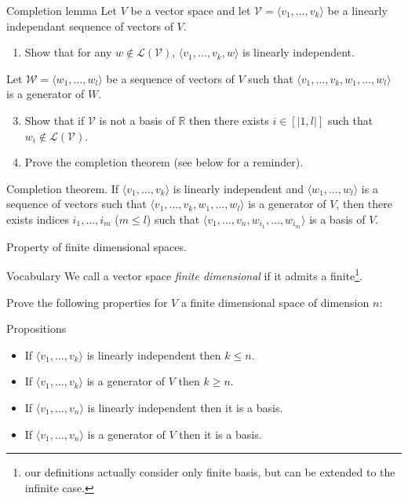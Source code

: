 \documentclass{beamer}
\begin{document}
\begin{frame}{Completion lemma}
  Let $V$ be a vector space and let $\mathcal{V} = \langle v_1, \dots, v_k \rangle$ be a linearly independant sequence of vectors of $V$.
  \begin{enumerate}
  \item Show that for any $w \notin \mathcal{L}(\mathcal{V})$, $\langle v_1, \dots, v_k, w \rangle$ is linearly independent.
  \end{enumerate}
  Let $ \mathcal{W} = \langle w_1, \dots, w_l \rangle$ be a sequence of vectors of $V$ such that $\langle v_1, \dots, v_k, w_1, \dots, w_l \rangle$ is a generator of  $W$.
  \begin{enumerate}
    \setcounter{enumi}{2}
  \item Show that if $\mathcal{V}$ is not a basis of $\mathbb{R}$ then there exists $i \in [| 1, l |]$ such that $w_i \notin \mathcal{L}(\mathcal{V})$.
  \item Prove the completion theorem (see below for a reminder).
  \end{enumerate}

  \begin{exampleblock}{Completion theorem.}
      If $\langle v_1, \dots, v_k \rangle$ is linearly independent and $\langle w_1, \dots, w_l \rangle$ is a sequence of vectors such that $\langle v_1, \dots, v_k, w_1, \dots, w_l \rangle$ is a generator of $V$, then there exists indices $i_1, \dots, i_m$ ($m \le l$) such that $\langle v_1, \dots, v_n, w_{i_1}, \dots, w_{i_m} \rangle$ is a basis of $V$.
  \end{exampleblock}
\end{frame}

\begin{frame}{Property of finite dimensional spaces.}
  \begin{exampleblock}{Vocabulary}
    We call a vector space \emph{finite dimensional} if it admits a finite\footnote{our definitions actually consider only finite basis, but can be extended to the infinite case.}.
  \end{exampleblock}

  Prove the following properties for $V$ a finite dimensional space of dimension $n$:
  \begin{block}{Propositions}
    \begin{itemize}
    \item If $\langle v_1, \dots, v_k \rangle$ is linearly independent then $k \le n$.
    \item If $\langle v_1, \dots, v_k \rangle$ is a generator of $V$ then $k \ge n$.
    \item If $\langle v_1, \dots, v_n \rangle$ is linearly independent then it is a basis.
    \item If $\langle v_1, \dots, v_n \rangle$ is a generator of $V$ then it is a basis.
    \end{itemize}
  \end{block}
\end{frame}
\end{document}
